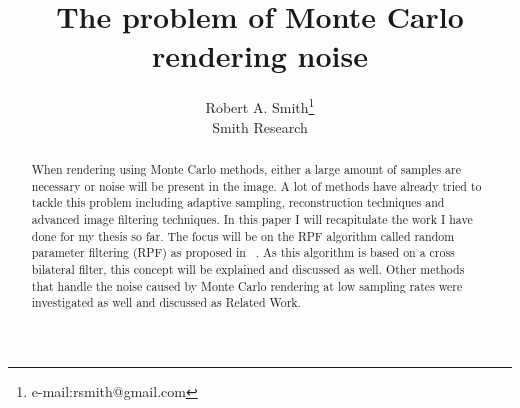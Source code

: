 \documentclass[review]{acmsiggraph}
\title{The problem of Monte Carlo rendering noise}
\author{Robert A. Smith\thanks{e-mail:rsmith@gmail.com}\\Smith Research}
\begin{document}



\maketitle


\begin{abstract}

When rendering using Monte Carlo methods, either a large amount of samples are necessary or noise will be present in the image.
A lot of methods have already tried to tackle this problem including adaptive sampling, reconstruction techniques and advanced image filtering techniques.
In this paper I will recapitulate the work I have done for my thesis so far. 
The focus will be on the RPF algorithm called random parameter filtering (RPF) as proposed in ~\cite{RPF11}.
As this algorithm is based on a cross bilateral filter, this concept will be explained and discussed as well.
Other methods that handle the noise caused by Monte Carlo rendering at low sampling rates were investigated as well and discussed as Related Work.




\end{abstract}
\end{document}
